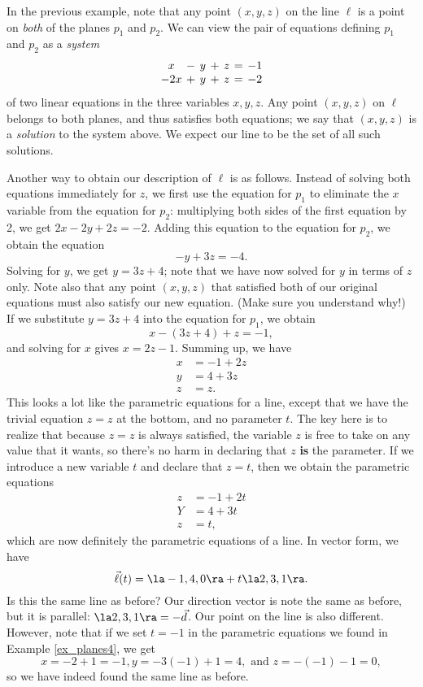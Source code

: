 In the previous example, note that any point $(x,y,z)$ on the line $\ell$ is a point on \textit{both} of the planes $p_1$ and $p_2$. We can view the pair of equations defining $p_1$ and $p_2$ as a \textit{system} 
\[\arraycolsep=2pt
\begin{array}{ccccccc}
x&-&y&+&z&=&-1\\
-2x&+&y&+&z&=&-2
\end{array}
\]
of two linear equations in the three variables $x,y,z$. Any point $(x,y,z)$ on $\ell$ belongs to both planes, and thus satisfies both equations; we say that $(x,y,z)$ is a \textit{solution} to the system above. We expect our line to be the set of all such solutions. 

Another way to obtain our description of $\ell$ is as follows. Instead of solving both equations immediately for $z$, we first use the equation for $p_1$ to eliminate the $x$ variable from the equation for $p_2$: multiplying both sides of the first equation by 2, we get $2x-2y+2z=-2$. Adding this equation to the equation for $p_2$, we obtain the equation
\[
-y+3z=-4.
\]
Solving for $y$, we get $y=3z+4$; note that we have now solved for $y$ in terms of $z$ only. Note also that any point $(x,y,z)$ that satisfied both of our original equations must also satisfy our new equation. (Make sure you understand why!) If we substitute $y=3z+4$ into the equation for $p_1$, we obtain
\[
x-(3z+4)+z = -1,
\]
and solving for $x$ gives $x=2z-1$. Summing up, we have
\begin{align*}
x & = -1+2z\\
y & = 4+3z\\
z & = z.
\end{align*}
This looks a lot like the parametric equations for a line, except that we have the trivial equation $z=z$ at the bottom, and no parameter $t$. The key here is to realize that because $z=z$ is always satisfied, the variable $z$ is free to take on any value that it wants, so there's no harm in declaring that $z$ \textbf{is} the parameter. If we introduce a new variable $t$ and declare that $z=t$, then we obtain the parametric equations
\begin{align*}
z & = -1+2t\\
Y & = 4+3t\\
z &= t,
\end{align*}
which are now definitely the parametric equations of a line. In vector form, we have
\[
\vec\ell(t) = \la -1, 4, 0\ra + t\la 2, 3, 1\ra.
\]
Is this the same line as before? Our direction vector is note the same as before, but it is parallel: $\la 2,3,1\ra = -\vec{d}$. Our point on the line is also different. However, note that if we set $t=-1$ in the parametric equations we found in Example \ref{ex_planes4}, we get
\[
x = -2+1 = -1, y = -3(-1)+1 = 4, \text{ and } z = -(-1)-1 = 0,
\]
so we have indeed found the same line as before.\\

